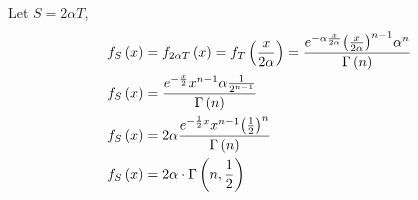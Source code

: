 \documentclass{article}
\begin{document}
Let $S=2\alpha T$,
\[\begin{gathered}
        {f_S}\left( x \right) = {f_{2\alpha T}}\left( x \right) = {f_T}\left( {\frac{x}{{2\alpha }}} \right) = \frac{{{e^{ - \alpha \frac{x}{{2\alpha }}}}{{\left( {\frac{x}{{2\alpha }}} \right)}^{n - 1}}{\alpha ^n}}}{{\Gamma \left( n \right)}} \hfill \\
        {f_S}\left( x \right) = \frac{{{e^{ - \frac{x}{2}}}{x^{n - 1}}\alpha \frac{1}{{{2^{n - 1}}}}}}{{\Gamma \left( n \right)}} \hfill \\
        {f_S}\left( x \right) = 2\alpha \frac{{{e^{ - \frac{1}{2}x}}{x^{n - 1}}{{\left( {\frac{1}{2}} \right)}^n}}}{{\Gamma \left( n \right)}} \hfill \\
        {f_S}\left( x \right) = 2\alpha  \cdot \Gamma \left( {n,\frac{1}{2}} \right) \hfill \\
    \end{gathered} \]
\end{document}
